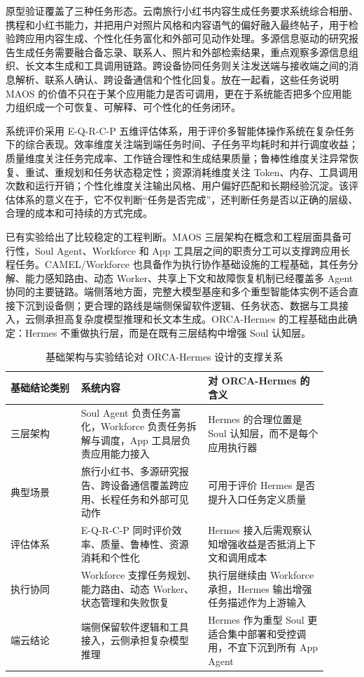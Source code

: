 原型验证覆盖了三种任务形态。云南旅行小红书内容生成任务要求系统综合相册、携程和小红书能力，并把用户对照片风格和内容语气的偏好融入最终帖子，用于检验跨应用内容生成、个性化任务富化和外部可见动作处理。多源信息驱动的研究报告生成任务需要融合备忘录、联系人、照片和外部检索结果，重点观察多源信息组织、长文本生成和工具调用链路。跨设备协同任务则关注发送端与接收端之间的消息解析、联系人确认、跨设备通信和个性化回复。放在一起看，这些任务说明 MAOS 的价值不只在于某个应用能力是否可调用，更在于系统能否把多个应用能力组织成一个可恢复、可解释、可个性化的任务闭环。

系统评价采用 E-Q-R-C-P 五维评估体系，用于评价多智能体操作系统在复杂任务下的综合表现。效率维度关注端到端任务时间、子任务平均耗时和并行调度收益；质量维度关注任务完成率、工作链合理性和生成结果质量；鲁棒性维度关注异常恢复、重试、重规划和任务状态稳定性；资源消耗维度关注 Token、内存、工具调用次数和运行开销；个性化维度关注输出风格、用户偏好匹配和长期经验沉淀。该评估体系的意义在于，它不仅判断“任务是否完成”，还判断任务是否以正确的层级、合理的成本和可持续的方式完成。

已有实验给出了比较稳定的工程判断。MAOS 三层架构在概念和工程层面具备可行性，Soul Agent、Workforce 和 App 工具层之间的职责分工可以支撑跨应用长程任务。CAMEL/Workforce 也具备作为执行协作基础设施的工程基础，其任务分解、能力感知路由、动态 Worker、共享上下文和故障恢复机制已经覆盖多 Agent 协同的主要链路。端侧落地方面，完整大模型基座和多个重型智能体实例不适合直接下沉到设备侧；更合理的路线是端侧保留软件逻辑、任务状态、数据与工具接入，云侧承担高复杂度模型推理和长文本生成。ORCA-Hermes 的工程基础由此确定：Hermes 不重做执行层，而是在既有三层结构中增强 Soul 认知层。

\begin{table}[h]
\centering
\begin{tabular}{p{0.20\linewidth}p{0.36\linewidth}p{0.34\linewidth}}
\hline
\textbf{基础结论类别} & \textbf{系统内容} & \textbf{对 ORCA-Hermes 的含义} \\
\hline
三层架构 & Soul Agent 负责任务富化，Workforce 负责任务拆解与调度，App 工具层负责应用能力接入 & Hermes 的合理位置是 Soul 认知层，而不是每个应用执行器 \\
典型场景 & 旅行小红书、多源研究报告、跨设备通信覆盖跨应用、长程任务和外部可见动作 & 可用于评价 Hermes 是否提升入口任务定义质量 \\
评估体系 & E-Q-R-C-P 同时评价效率、质量、鲁棒性、资源消耗和个性化 & Hermes 接入后需观察认知增强收益是否抵消上下文和调用成本 \\
执行协同 & Workforce 支撑任务规划、能力路由、动态 Worker、状态管理和失败恢复 & 执行层继续由 Workforce 承担，Hermes 输出增强任务描述作为上游输入 \\
端云结论 & 端侧保留软件逻辑和工具接入，云侧承担复杂模型推理 & Hermes 作为重型 Soul 更适合集中部署和受控调用，不宜下沉到所有 App Agent \\
\hline
\end{tabular}
\caption{基础架构与实验结论对 ORCA-Hermes 设计的支撑关系}
\label{tab:rt3-foundation}
\end{table}

